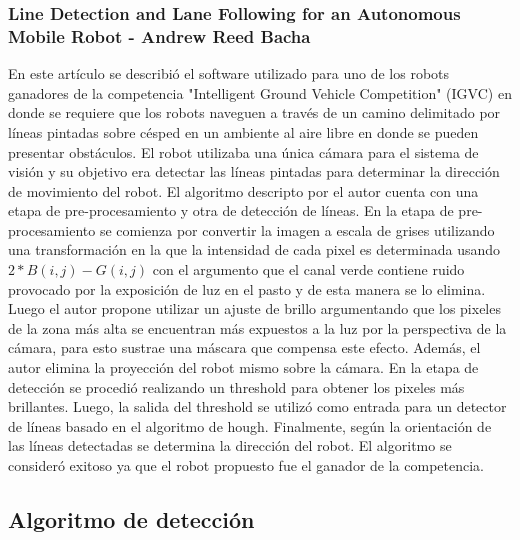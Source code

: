 	\subsubsection{Line Detection and Lane Following for an Autonomous Mobile Robot - Andrew Reed Bacha}
	En este artículo se describió el software utilizado para uno de los robots ganadores de la competencia "Intelligent Ground Vehicle Competition" (IGVC) en donde se requiere que los robots naveguen  a través de un camino delimitado por líneas pintadas sobre césped en un ambiente al aire libre en donde se pueden presentar obstáculos. El robot utilizaba una única cámara para el sistema de visión y su objetivo era detectar las líneas pintadas 
para determinar la dirección de movimiento del robot. El algoritmo descripto por el autor cuenta con una etapa de pre-procesamiento y otra de detección de líneas. En la etapa de pre-procesamiento se comienza por convertir la imagen a escala de grises utilizando una transformación en la que la intensidad de cada pixel es determinada usando $2*B(i,j) - G(i,j)$ con el argumento que el canal verde contiene ruido provocado por la exposición de luz en el pasto y de esta manera se lo elimina. Luego el autor propone utilizar un ajuste de brillo argumentando que los pixeles de la zona más alta se encuentran más expuestos a la luz por la perspectiva de la cámara, para esto sustrae una máscara que compensa este efecto. Además, el autor elimina la proyección del robot mismo sobre la cámara. En la etapa de detección se procedió realizando un threshold para obtener los pixeles más brillantes. Luego, la salida del threshold se utilizó como entrada para un detector de líneas basado en el algoritmo de hough. Finalmente, según la orientación de las líneas detectadas se determina la dirección del robot. El algoritmo se consideró exitoso ya que el robot propuesto fue el ganador de la competencia.


	
\subsection{Algoritmo de detección}
